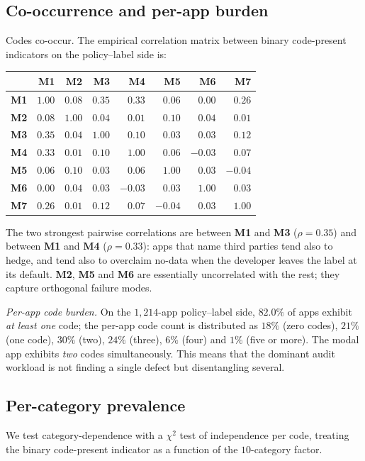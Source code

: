 \documentclass[11pt,a4paper]{article}
\newcommand{\code}[1]{\textsf{\textbf{#1}}}
\begin{document}
\subsection{Co-occurrence and per-app burden}
Codes co-occur. The empirical correlation matrix between binary
code-present indicators on the policy--label side is:
\begin{center}\small
\begin{tabular}{l|rrrrrrr}
& \code{M1} & \code{M2} & \code{M3} & \code{M4} & \code{M5} & \code{M6} & \code{M7}\\
\hline
\code{M1}& $1.00$ & $0.08$ & $0.35$ & $0.33$ & $0.06$ & $0.00$ & $0.26$ \\
\code{M2}& $0.08$ & $1.00$ & $0.04$ & $0.01$ & $0.10$ & $0.04$ & $0.01$ \\
\code{M3}& $0.35$ & $0.04$ & $1.00$ & $0.10$ & $0.03$ & $0.03$ & $0.12$ \\
\code{M4}& $0.33$ & $0.01$ & $0.10$ & $1.00$ & $0.06$ & $-0.03$ & $0.07$ \\
\code{M5}& $0.06$ & $0.10$ & $0.03$ & $0.06$ & $1.00$ & $0.03$ & $-0.04$ \\
\code{M6}& $0.00$ & $0.04$ & $0.03$ & $-0.03$ & $0.03$ & $1.00$ & $0.03$ \\
\code{M7}& $0.26$ & $0.01$ & $0.12$ & $0.07$ & $-0.04$ & $0.03$ & $1.00$ \\
\end{tabular}
\end{center}
The two strongest pairwise correlations are between \code{M1} and
\code{M3} ($\rho=0.35$) and between \code{M1} and \code{M4}
($\rho=0.33$): apps that name third parties tend also to hedge, and
tend also to overclaim no-data when the developer leaves the label at
its default. \code{M2}, \code{M5} and \code{M6} are essentially
uncorrelated with the rest; they capture orthogonal failure modes.

\emph{Per-app code burden.} On the $1{,}214$-app policy--label side,
$82.0\%$ of apps exhibit \emph{at least one} code; the per-app code
count is distributed as $18\%$ (zero codes), $21\%$ (one code),
$30\%$ (two), $24\%$ (three), $6\%$ (four) and $1\%$ (five or more).
The modal app exhibits \emph{two} codes simultaneously. This means
that the dominant audit workload is not finding a single defect but
disentangling several.

\subsection{Per-category prevalence}
We test category-dependence with a $\chi^2$ test of independence per
code, treating the binary code-present indicator as a function of the
$10$-category factor.
\end{document}
